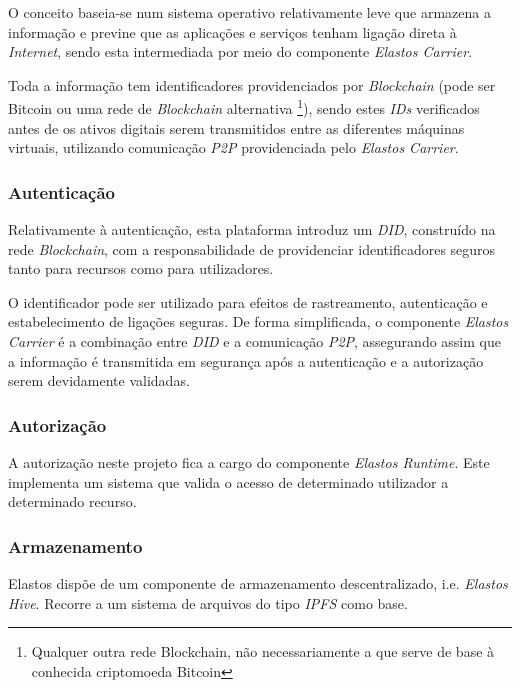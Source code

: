 O conceito baseia-se num sistema operativo relativamente leve que armazena a informação e previne que as aplicações e serviços tenham ligação direta à \emph{Internet}, sendo esta intermediada por meio do componente \emph{Elastos Carrier}. 

Toda a informação tem identificadores providenciados por \emph{Blockchain} (pode ser Bitcoin ou uma rede de \emph{Blockchain} alternativa \footnote{Qualquer outra rede Blockchain, não necessariamente a que serve de base à conhecida criptomoeda Bitcoin}), sendo estes \emph{IDs} verificados antes de os ativos digitais serem transmitidos entre as diferentes máquinas virtuais, utilizando comunicação \emph{\acrfull{P2P}}\cite{what_are_P2P_networks} providenciada pelo \emph{Elastos Carrier}\cite{elastos_developer}.

\subsubsection*{Autenticação}

Relativamente à autenticação, esta plataforma introduz um \emph{\acrfull{DID}}, construído na rede \emph{Blockchain}, com a responsabilidade de providenciar identificadores seguros tanto para recursos como para utilizadores.

O identificador pode ser utilizado para efeitos de rastreamento, autenticação e estabelecimento de ligações seguras. De forma simplificada, o componente \emph{Elastos Carrier} é a combinação entre \emph{\acrshort{DID}} e a comunicação \emph{\acrshort{P2P}}, assegurando assim que a informação é transmitida em segurança após a autenticação e a autorização serem devidamente validadas\cite{elastos_white_paper}.

\subsubsection*{Autorização}
A autorização neste projeto fica a cargo do componente \emph{Elastos Runtime}. Este implementa um sistema que valida o acesso de determinado utilizador a determinado recurso\cite{elastos_white_paper}.

\subsubsection*{Armazenamento}
Elastos dispõe de um componente de armazenamento descentralizado, i.e. \emph{Elastos Hive}. Recorre a um sistema de arquivos do tipo \emph{\acrfull{IPFS}}\cite{ipfs} como base. 

